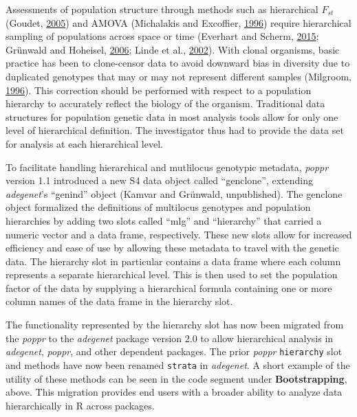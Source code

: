 \documentclass[double,12pt]{beavtex}
\begin{document}
  Assessments of population structure through methods such as hierarchical
  \(F_{st}\) (Goudet, \protect\hyperlink{ref-goudet2005hierfstat}{2005})
  and AMOVA (Michalakis and Excoffier,
  \protect\hyperlink{ref-michalakis1996generic}{1996}) require
  hierarchical sampling of populations across space or time (Everhart and
  Scherm, \protect\hyperlink{ref-everhart2014fine}{2015}; Grünwald and
  Hoheisel, \protect\hyperlink{ref-grunwald2006hierarchical}{2006}; Linde
  et al., \protect\hyperlink{ref-linde2002population}{2002}). With clonal
  organisms, basic practice has been to clone-censor data to avoid
  downward bias in diversity due to duplicated genotypes that may or may
  not represent different samples (Milgroom,
  \protect\hyperlink{ref-milgroom1996recombination}{1996}). This
  correction should be performed with respect to a population hierarchy to
  accurately reflect the biology of the organism. Traditional data
  structures for population genetic data in most analysis tools allow for
  only one level of hierarchical definition. The investigator thus had to
  provide the data set for analysis at each hierarchical level.
  
  To facilitate handling hierarchical and mutlilocus genotypic metadata,
  \emph{poppr} version 1.1 introduced a new S4 data object called
  ``genclone'', extending \emph{adegenet}'s ``genind'' object (Kamvar and
  Grünwald, unpublished). The genclone object formalized the definitions
  of multilocus genotypes and population hierarchies by adding two slots
  called ``mlg'' and ``hierarchy'' that carried a numeric vector and a
  data frame, respectively. These new slots allow for increased efficiency
  and ease of use by allowing these metadata to travel with the genetic
  data. The hierarchy slot in particular contains a data frame where each
  column represents a separate hierarchical level. This is then used to
  set the population factor of the data by supplying a hierarchical
  formula containing one or more column names of the data frame in the
  hierarchy slot.
  
  The functionality represented by the hierarchy slot has now been
  migrated from the \emph{poppr} to the \emph{adegenet} package version
  2.0 to allow hierarchical analysis in \emph{adegenet}, \emph{poppr}, and
  other dependent packages. The prior \emph{poppr} \texttt{hierarchy} slot
  and methods have now been renamed \texttt{strata} in \emph{adegenet}. A
  short example of the utility of these methods can be seen in the code
  segment under \textbf{Bootstrapping}, above. This migration provides end
  users with a broader ability to analyze data hierarchically in R across
  packages.
  
\end{document}
